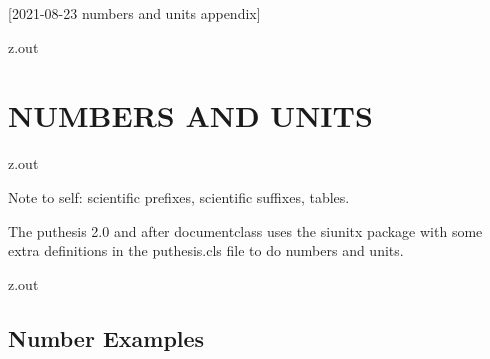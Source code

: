 [2021-08-23 numbers and units appendix]

%





\begin{VerbatimOut}{z.out}
\chapter{NUMBERS AND UNITS}
\end{VerbatimOut}

\MyIO


\begin{VerbatimOut}{z.out}

Note to self: scientific prefixes, scientific suffixes, tables.

The puthesis 2.0 and after documentclass uses the siunitx
package with some extra definitions in the puthesis.cls
file to do numbers and units.
\end{VerbatimOut}

\MyIO


\begin{VerbatimOut}{z.out}

\section{Number Examples}
\end{VerbatimOut}

\MyIO


